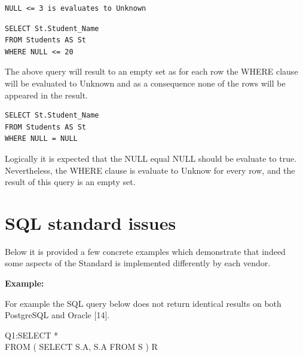 \hfill\newline
\begin{mdframed}[nobreak=true, backgroundcolor=lightgray!20] 
\begin{lstlisting}[style=SQL]
NULL <= 3 is evaluates to Unknown 
\end{lstlisting}
\end{mdframed}

\hfill\newline
\begin{mdframed}[nobreak=true, backgroundcolor=lightgray!20] 
\begin{lstlisting}[style=SQL]
SELECT St.Student_Name
FROM Students AS St 
WHERE NULL <= 20
\end{lstlisting}
\end{mdframed}

The above query will result to an empty set as for each row the WHERE clause will be evaluated to Unknown and as a consequence none of the rows will be appeared in the result. 

\hfill\newline
\begin{mdframed}[nobreak=true, backgroundcolor=lightgray!20] 
\begin{lstlisting}[style=SQL]
SELECT St.Student_Name
FROM Students AS St 
WHERE NULL = NULL
\end{lstlisting}
\end{mdframed}
Logically it is expected that the NULL equal NULL should be evaluate to true. Nevertheless, the WHERE clause is evaluate to Unknow for every row, and the result of this query is an empty set. 


\section{SQL standard issues} 

Below it is provided a few concrete examples which demonstrate that indeed some aspects of the Standard is implemented differently by each vendor. 
 
\noindent\textbf{Example:}

For example the SQL query below does not return identical results on both PostgreSQL and Oracle [14]. 


\begin{mdframed}[backgroundcolor=lightgray!20][h] 
Q1:SELECT * 
 \\FROM ( SELECT S.A, S.A FROM S ) R
\end{mdframed}

